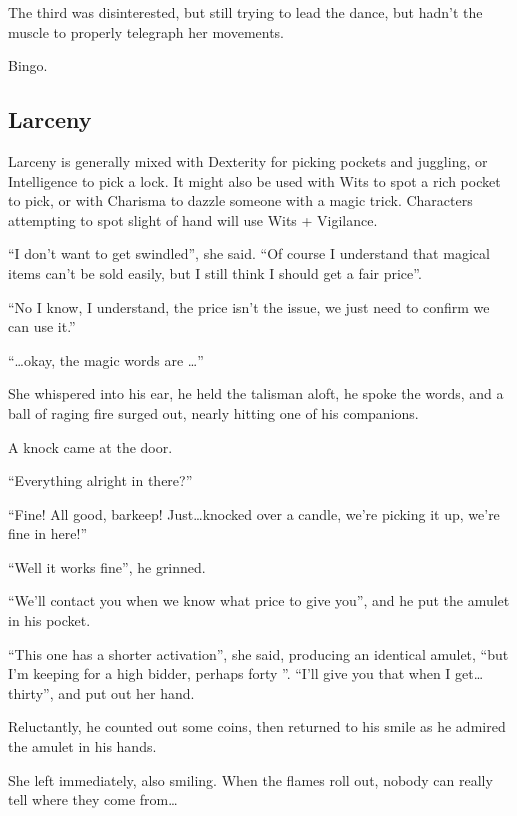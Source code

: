 \begin{multicols}{2}
\begin{exampletext}
  The third was disinterested, but still trying to lead the dance, but hadn't the muscle to properly telegraph her movements.

  Bingo.
\end{exampletext}

\subsection{Larceny}

Larceny is generally mixed with Dexterity for picking pockets and juggling, or Intelligence to pick a lock.
It might also be used with Wits to spot a rich pocket to pick, or with Charisma to dazzle someone with a magic trick.
Characters attempting to spot slight of hand will use Wits + Vigilance.

\begin{exampletext}
  ``I don't want to get swindled'', she said.
  ``Of course I understand that magical items can't be sold easily, but I still think I should get a fair price''.

  ``No I know, I understand, the price isn't the issue, we just need to confirm we can use it.''

  ``\ldots okay, the magic words are \ldots''

  She whispered into his ear, he held the talisman aloft, he spoke the words, and a ball of raging fire surged out, nearly hitting one of his companions.

  A knock came at the door.

  ``Everything alright in there?''

  ``Fine!
  All good, barkeep!
  Just\ldots knocked over a candle, we're picking it up, we're fine in here!''

  ``Well it works fine'', he grinned.

  ``We'll contact you when we know what price to give you'', and he put the amulet in his pocket.

  ``This one has a shorter activation'', she said, producing an identical amulet, ``but I'm keeping for a high bidder, perhaps forty ''.
  ``I'll give you that when I get\ldots thirty'', and put out her hand.

  Reluctantly, he counted out some coins, then returned to his smile as he admired the amulet in his hands.

  She left immediately, also smiling.
  When the flames roll out, nobody can really tell where they come from\ldots
\end{exampletext}


\end{multicols}
